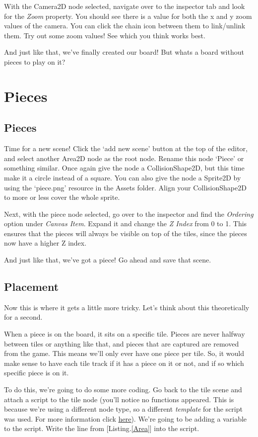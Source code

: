 \documentclass[14pt]{extarticle}
\newcommand{\prettyref}[2]{[{#1}.\ref{#2}]}
\begin{document}
With the Camera2D node selected, navigate over to the inspector tab and look for the \textit{Zoom} property. You should see there is a value for both the x and y zoom values of the camera. You can click the chain icon between them to link/unlink them. Try out some zoom values! See which you think works best.

And just like that, we've finally created our board! But whats a board without pieces to play on it?

\newpage

\section{Pieces}
\subsection*{Pieces}
Time for a new scene! Click the `add new scene' button at the top of the editor, and select another Area2D node as the root node. Rename this node `Piece' or something similar. Once again give the node a CollisionShape2D, but this time make it a circle instead of a square. You can also give the node a Sprite2D by using the `piece.png' resource in the Assets folder. Align your CollisionShape2D to more or less cover the whole sprite.

Next, with the piece node selected, go over to the inspector and find the \textit{Ordering} option under \textit{Canvas Item}. Expand it and change the \textit{Z Index} from 0 to 1. This ensures that the pieces will always be visible on top of the tiles, since the pieces now have a higher Z index.

And just like that, we've got a piece! Go ahead and save that scene.

\subsection*{Placement}
Now this is where it gets a little more tricky. Let's think about this theoretically for a second.

When a piece is on the board, it sits on a specific tile. Pieces are never halfway between tiles or anything like that, and pieces that are captured are removed from the game. This means we'll only ever have one piece per tile. So, it would make sense to have each tile track if it has a piece on it or not, and if so which specific piece is on it.

To do this, we're going to do some more coding. Go back to the tile scene and attach a script to the tile node (you'll notice no functions appeared. This is because we're using a different node type, so a different \textit{template} for the script was used. For more information click \href{https://docs.godotengine.org/en/stable/tutorials/scripting/creating_script_templates.html}{\underline{here}}). We're going to be adding a variable to the script. Write the line from \prettyref{Listing}{Area} into the script.
\end{document}
